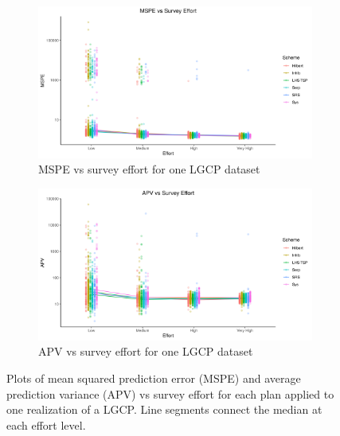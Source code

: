 \documentclass[review]{elsarticle}
\begin{document}
\begin{figure}

\begin{subfigure}{5in}
\includegraphics[width=5in]{../graphics/MSPE-effort-notpaneled-LGCP000004.png}
\caption{MSPE vs survey effort for one LGCP dataset}
\label{mspelgcp}
\end{subfigure}

\begin{subfigure}{5in}
\includegraphics[width=5in]{../graphics/APV-effort-notpaneled-LGCP000004.png}
\caption{APV vs survey effort for one LGCP dataset}
\label{apvlgcp}
\end{subfigure}

\caption{Plots of mean squared prediction error (MSPE) and average prediction
variance (APV) vs survey effort for each plan applied to one realization of a
LGCP. Line segments connect the median at each effort level.}
\label{lgcpresults}
\end{figure}

%
%
%
\end{document}
